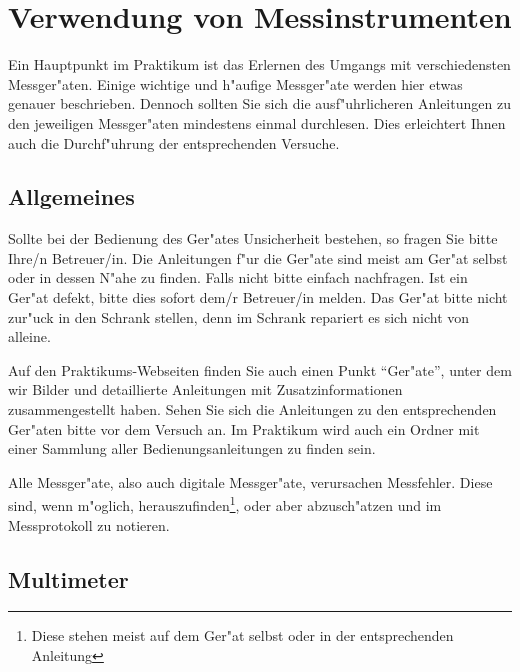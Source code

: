 \chapter{Verwendung von Messinstrumenten}   \label{c:messinstr}

Ein Hauptpunkt im Praktikum ist das Erlernen des Umgangs mit
verschiedensten Messger"aten. Einige wichtige und h"aufige
Messger"ate werden hier etwas genauer beschrieben. Dennoch sollten
Sie sich die ausf"uhrlicheren Anleitungen zu den jeweiligen
Messger"aten mindestens einmal durchlesen. Dies erleichtert Ihnen
auch die Durchf"uhrung der entsprechenden Versuche.

\section{Allgemeines}

Sollte bei der Bedienung des Ger"ates Unsicherheit bestehen, so
fragen Sie bitte Ihre/n Betreuer/in. Die Anleitungen f"ur die
Ger"ate  sind meist am Ger"at selbst oder in dessen
N"ahe zu finden. Falls nicht bitte einfach nachfragen. Ist ein
Ger"at defekt, bitte dies sofort dem/r Betreuer/in melden. Das
Ger"at bitte nicht zur"uck in den Schrank stellen, denn im Schrank
repariert es sich nicht von alleine.

Auf den Praktikums-Webseiten  finden Sie
auch einen Punkt "`Ger"ate"', unter dem wir Bilder und detaillierte
Anleitungen mit Zusatzinformationen zusammengestellt haben. Sehen
Sie sich die Anleitungen zu den entsprechenden Ger"aten bitte vor
dem Versuch an. Im Praktikum wird auch ein Ordner mit einer
Sammlung aller Bedienungsanleitungen zu
finden sein.

Alle Messger"ate, also auch digitale Messger"ate,
verursachen Messfehler. Diese sind, wenn
m"oglich, herauszufinden\footnote{Diese stehen meist auf dem Ger"at
selbst oder in der entsprechenden Anleitung}, oder aber
abzusch"atzen und im Messprotokoll zu notieren.

\section{Multimeter}

